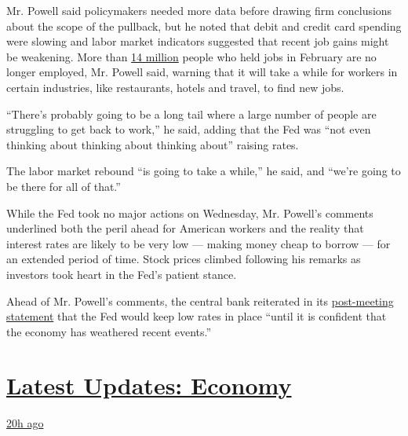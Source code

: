 Mr. Powell said policymakers needed more data before drawing firm
conclusions about the scope of the pullback, but he noted that debit and
credit card spending were slowing and labor market indicators suggested
that recent job gains might be weakening. More than
\href{https://fred.stlouisfed.org/series/PAYEMS\#:~:text=Notes\%3A,and\%20the\%20unincorporated\%20self\%2Demployed.}{14
million} people who held jobs in February are no longer employed, Mr.
Powell said, warning that it will take a while for workers in certain
industries, like restaurants, hotels and travel, to find new jobs.

``There's probably going to be a long tail where a large number of
people are struggling to get back to work,'' he said, adding that the
Fed was ``not even thinking about thinking about thinking about''
raising rates.

The labor market rebound ``is going to take a while,'' he said, and
``we're going to be there for all of that.''

While the Fed took no major actions on Wednesday, Mr. Powell's comments
underlined both the peril ahead for American workers and the reality
that interest rates are likely to be very low --- making money cheap to
borrow --- for an extended period of time. Stock prices climbed
following his remarks as investors took heart in the Fed's patient
stance.

Ahead of Mr. Powell's comments, the central bank reiterated in its
\href{https://www.federalreserve.gov/newsevents/pressreleases/monetary20200729a.htm}{post-meeting
statement} that the Fed would keep low rates in place ``until it is
confident that the economy has weathered recent events.''

\hypertarget{latest-updates-economy}{%
\section{\texorpdfstring{\href{https://www.nytimes3xbfgragh.onion/live/2020/07/31/business/stock-market-today-coronavirus?action=click\&pgtype=Article\&state=default\&region=MAIN_CONTENT_1\&context=storylines_live_updates}{Latest
Updates:
Economy}}{Latest Updates: Economy}}\label{latest-updates-economy}}

\href{https://www.nytimes3xbfgragh.onion/live/2020/07/31/business/stock-market-today-coronavirus?action=click\&pgtype=Article\&state=default\&region=MAIN_CONTENT_1\&context=storylines_live_updates\#kodaks-chief-executive-was-given-stock-options-then-the-share-price-spiked-1000-percent}{20h
ago}

